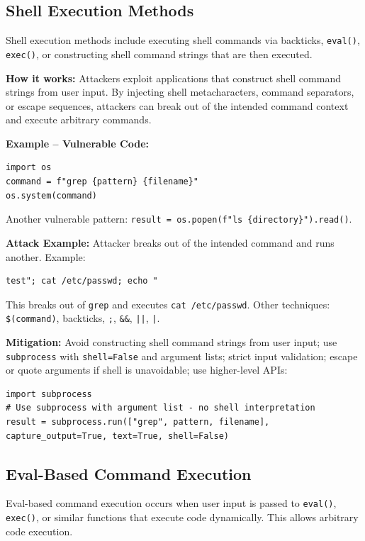 \subsection{Shell Execution Methods}
\label{sec:cmd_shell_exec}

Shell execution methods include executing shell commands via backticks, \texttt{eval()}, \texttt{exec()}, or constructing shell command strings that are then executed.

\textbf{How it works:} Attackers exploit applications that construct shell command strings from user input. By injecting shell metacharacters, command separators, or escape sequences, attackers can break out of the intended command context and execute arbitrary commands.

\textbf{Example -- Vulnerable Code:}

\begin{lstlisting}[style=pycode]
import os
command = f"grep {pattern} {filename}"
os.system(command)
\end{lstlisting}
Another vulnerable pattern: \texttt{result = os.popen(f"ls \{directory\}").read()}.

\textbf{Attack Example:} Attacker breaks out of the intended command and runs another. Example:
\begin{lstlisting}[style=attackcode]
test"; cat /etc/passwd; echo "
\end{lstlisting}
This breaks out of \texttt{grep} and executes \texttt{cat /etc/passwd}. Other techniques: \texttt{\$(command)}, backticks, \texttt{;}, \texttt{\&\&}, \texttt{||}, \texttt{|}.

\textbf{Mitigation:} Avoid constructing shell command strings from user input; use \texttt{subprocess} with \texttt{shell=False} and argument lists; strict input validation; escape or quote arguments if shell is unavoidable; use higher-level APIs:

\begin{lstlisting}[style=pycode]
import subprocess
# Use subprocess with argument list - no shell interpretation
result = subprocess.run(["grep", pattern, filename], capture_output=True, text=True, shell=False)
\end{lstlisting}

\subsection{Eval-Based Command Execution}
\label{sec:cmd_eval}

Eval-based command execution occurs when user input is passed to \texttt{eval()}, \texttt{exec()}, or similar functions that execute code dynamically. This allows arbitrary code execution.

